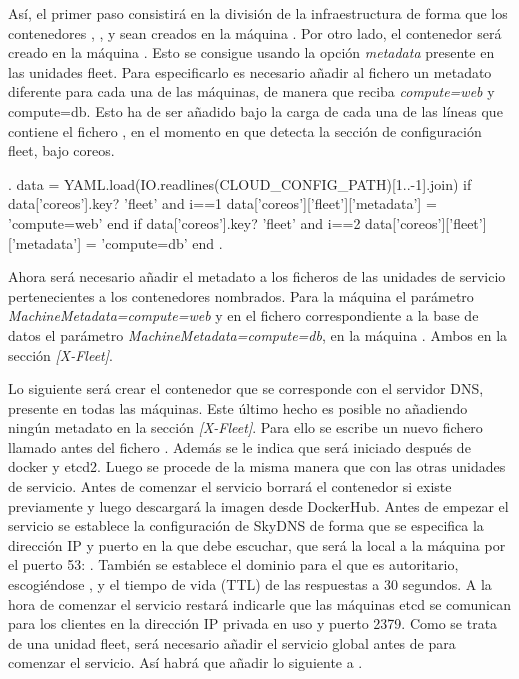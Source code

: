 Así, el primer paso consistirá en la división de la infraestructura de forma que los contenedores , ,  y  sean creados en la máquina . Por otro lado, el contenedor  será creado en la máquina . Esto se consigue usando la opción \textit{metadata} presente en las unidades fleet. Para especificarlo es necesario añadir al fichero  un metadato diferente para cada una de las máquinas, de manera que  reciba \textit{compute=web} y  {compute=db}. Esto ha de ser añadido bajo la carga de cada una de las líneas que contiene el fichero , en el momento en que detecta la sección de configuración fleet, bajo coreos.

\begin{codelisting}
\label{code:vagrantfile2}
\begin{code}
.
data = YAML.load(IO.readlines(CLOUD_CONFIG_PATH)[1..-1].join)
if data['coreos'].key? 'fleet' and i==1
  data['coreos']['fleet']['metadata'] = 'compute=web'
end
if data['coreos'].key? 'fleet' and i==2
 data['coreos']['fleet']['metadata'] = 'compute=db'
end
.
\end{code}
\end{codelisting}

Ahora será necesario añadir el metadato a los ficheros de las unidades de servicio pertenecientes a los contenedores nombrados. Para la máquina  el parámetro \textit{MachineMetadata=compute=web} y en el fichero correspondiente a la base de datos el parámetro \textit{MachineMetadata=compute=db}, en la máquina . Ambos en la sección \textit{[X-Fleet]}.

Lo siguiente será crear el contenedor que se corresponde con el servidor DNS, presente en todas las máquinas. Este último hecho es posible no añadiendo ningún metadato en la sección \textit{[X-Fleet]}. Para ello se escribe un nuevo fichero llamado  antes del fichero . Además se le indica que será iniciado después de docker y etcd2. Luego se procede de la misma manera que con las otras unidades de servicio. Antes de comenzar el servicio borrará el contenedor si existe previamente y luego descargará la imagen desde DockerHub. Antes de empezar el servicio se establece la configuración de SkyDNS de forma que se especifica la dirección IP y puerto en la que debe escuchar, que será la local a la máquina por el puerto 53: . También se establece el dominio para el que es autoritario, escogiéndose , y el tiempo de vida (TTL) de las respuestas a 30 segundos. A la hora de comenzar el servicio restará indicarle que las máquinas etcd se comunican para los clientes en la dirección IP privada en uso y puerto 2379. Como se trata de una unidad fleet, será necesario añadir el servicio global  antes de  para comenzar el servicio. Así habrá que añadir lo siguiente a .

